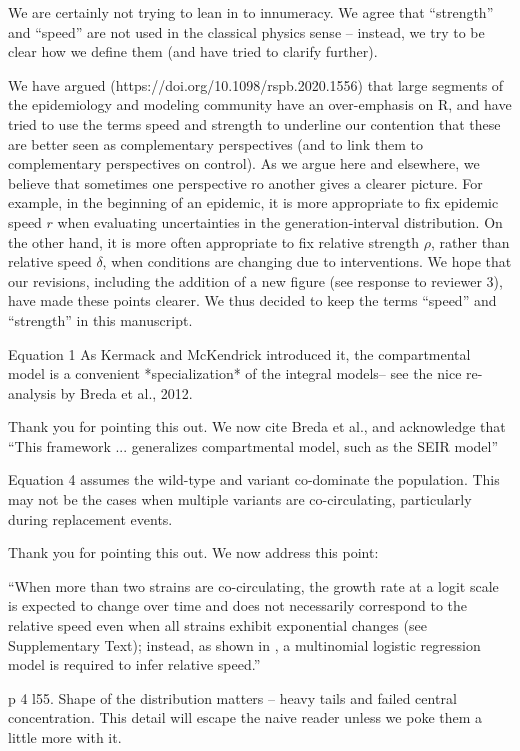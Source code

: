 \documentclass[12pt]{article}
\newcommand{\revtext}{\textsf}
\begin{document}
We are certainly not trying to lean in to innumeracy. We agree that ``strength'' and ``speed'' are not used in the classical physics sense -- instead, we try to be clear how we define them (and have tried to clarify further).

We have argued (https://doi.org/10.1098/rspb.2020.1556) that large segments of the epidemiology and modeling community have an over-emphasis on R, and have tried to use the terms speed and strength to underline our contention that these are better seen as complementary perspectives (and to link them to complementary perspectives on control).
As we argue here and elsewhere, we believe that sometimes one perspective ro another gives a clearer picture.
For example, in the beginning of an epidemic, it is more appropriate to fix epidemic speed $r$ when evaluating uncertainties in the generation-interval distribution.
On the other hand, it is more often appropriate to fix relative strength $\rho$, rather than relative speed $\delta$, when conditions are changing due to interventions.
We hope that our revisions, including the addition of a new figure (see response to reviewer 3), have made these points clearer.
We thus decided to keep the terms ``speed'' and ``strength'' in this manuscript.

\revtext{Equation 1 As Kermack and McKendrick introduced it, the compartmental model is a convenient *specialization* of the integral models-- see the nice re-analysis by Breda et al., 2012.}

Thank you for pointing this out. We now cite Breda et al., and acknowledge that ``This framework ... generalizes compartmental model, such as the SEIR model''

\revtext{Equation 4 assumes the wild-type and variant co-dominate the population.  This may not be the cases when multiple variants are co-circulating, particularly during replacement events.}

Thank you for pointing this out. We now address this point:

``When more than two strains are co-circulating, the growth rate at a logit scale is expected to change over time and does not necessarily correspond to the relative speed even when all strains exhibit exponential changes (see Supplementary Text);
instead, as shown in \citep{campbell2021increased}, a multinomial logistic regression model is required to infer relative speed.''

\revtext{p 4 l55.  Shape of the distribution matters -- heavy tails and failed central concentration.  This detail will escape the naive reader unless we poke them a little more with it.}
\end{document}
